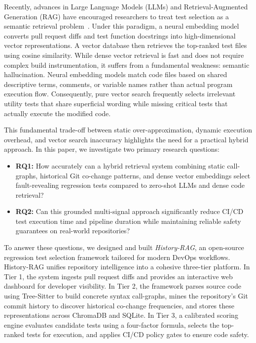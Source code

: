 \documentclass[12pt,onecolumn,draftclsnofoot]{IEEEtran}
\begin{document}
Recently, advances in Large Language Models (LLMs) and Retrieval-Augmented Generation (RAG) have encouraged researchers to treat test selection as a semantic retrieval problem~\cite{lewis2020retrieval, gao2024retrieval}. Under this paradigm, a neural embedding model converts pull request diffs and test function docstrings into high-dimensional vector representations. A vector database then retrieves the top-ranked test files using cosine similarity. While dense vector retrieval is fast and does not require complex build instrumentation, it suffers from a fundamental weakness: semantic hallucination. Neural embedding models match code files based on shared descriptive terms, comments, or variable names rather than actual program execution flow. Consequently, pure vector search frequently selects irrelevant utility tests that share superficial wording while missing critical tests that actually execute the modified code.

This fundamental trade-off between static over-approximation, dynamic execution overhead, and vector search inaccuracy highlights the need for a practical hybrid approach. In this paper, we investigate two primary research questions:
\begin{itemize}
    \item \textbf{RQ1:} How accurately can a hybrid retrieval system combining static call-graphs, historical Git co-change patterns, and dense vector embeddings select fault-revealing regression tests compared to zero-shot LLMs and dense code retrieval?
    \item \textbf{RQ2:} Can this grounded multi-signal approach significantly reduce CI/CD test execution time and pipeline duration while maintaining reliable safety guarantees on real-world repositories?
\end{itemize}

To answer these questions, we designed and built \textit{History-RAG}, an open-source regression test selection framework tailored for modern DevOps workflows. History-RAG unifies repository intelligence into a cohesive three-tier platform. In Tier 1, the system ingests pull request diffs and provides an interactive web dashboard for developer visibility. In Tier 2, the framework parses source code using Tree-Sitter to build concrete syntax call-graphs, mines the repository's Git commit history to discover historical co-change frequencies, and stores these representations across ChromaDB and SQLite. In Tier 3, a calibrated scoring engine evaluates candidate tests using a four-factor formula, selects the top-ranked tests for execution, and applies CI/CD policy gates to ensure code safety.
\end{document}
